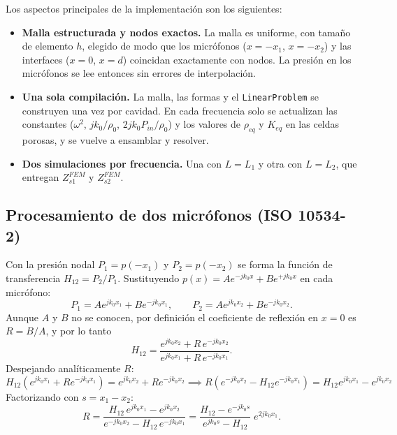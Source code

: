 \documentclass[11pt,a4paper]{article}
\begin{document}
Los aspectos principales de la implementación son los siguientes:
\begin{itemize}[leftmargin=*]
\item \textbf{Malla estructurada y nodos exactos.} La malla es uniforme, con tamaño de elemento $h$, elegido de modo que los micrófonos ($x=-x_1$, $x=-x_2$) y las interfaces ($x=0$, $x=d$) coincidan exactamente con nodos. La presión en los micrófonos se lee entonces sin errores de interpolación.
\item \textbf{Una sola compilación.} La malla, las formas y el \texttt{LinearProblem} se construyen una vez por cavidad. En cada frecuencia solo se actualizan las constantes ($\omega^2$, $jk_0/\rho_0$, $2jk_0P_{in}/\rho_0$) y los valores de $\rho_{eq}$ y $K_{eq}$ en las celdas porosas, y se vuelve a ensamblar y resolver.
\item \textbf{Dos simulaciones por frecuencia.} Una con $L=L_1$ y otra con $L=L_2$, que entregan $Z_{s1}^{FEM}$ y $Z_{s2}^{FEM}$.
\end{itemize}

\subsection{Procesamiento de dos micrófonos (ISO 10534-2)}
Con la presión nodal $P_1=p(-x_1)$ y $P_2=p(-x_2)$ se forma la función de transferencia $H_{12}=P_2/P_1$. Sustituyendo $p(x)=Ae^{-jk_0x}+Be^{+jk_0x}$ en cada micrófono:
\begin{equation}
P_1=Ae^{jk_0x_1}+Be^{-jk_0x_1},\qquad P_2=Ae^{jk_0x_2}+Be^{-jk_0x_2}.
\end{equation}
Aunque $A$ y $B$ no se conocen, por definición el coeficiente de reflexión en $x=0$ es $R=B/A$, y por lo tanto
\begin{equation}
H_{12}=\frac{e^{jk_0x_2}+R\,e^{-jk_0x_2}}{e^{jk_0x_1}+R\,e^{-jk_0x_1}} .
\end{equation}
Despejando analíticamente $R$:
\begin{equation}
H_{12} \left( e^{j k_0 x_1} + R e^{-j k_0 x_1} \right) = e^{j k_0 x_2} + R e^{-j k_0 x_2} \implies R \left( e^{-j k_0 x_2} - H_{12} e^{-j k_0 x_1} \right) = H_{12} e^{j k_0 x_1} - e^{j k_0 x_2}
\end{equation}
Factorizando con $s=x_1-x_2$:
\begin{equation}
R=\frac{H_{12}\,e^{jk_0x_1}-e^{jk_0x_2}}{e^{-jk_0x_2}-H_{12}\,e^{-jk_0x_1}}
=\frac{H_{12}-e^{-jk_0s}}{e^{jk_0s}-H_{12}}\;e^{2jk_0x_1}.
\label{eq:R_iso}
\end{equation}
\end{document}
